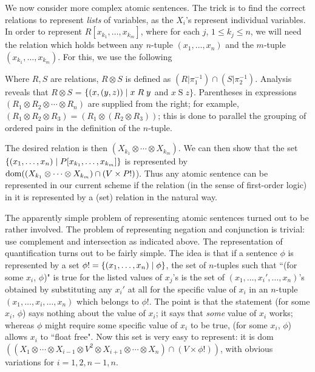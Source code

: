 We now consider more complex atomic sentences.  The trick is
to find the correct relations to represent {\itshape lists\/}
of variables, as the $X_i$'s represent individual variables.  In order to
represent $R[x_{k_1},\ldots,x_{k_m}]$, where for each $j$, $1 \leq k_j \leq n$,
we will need the relation which holds between any $n$-tuple $(x_1,\ldots,x_n)$
and the $m$-tuple $(x_{k_1},\ldots,x_{k_m})$.  For this, we use the following

\begin{definition}
 Where $R, S$ are relations, $R \otimes S$ is defined as $(R|\pi_1^{-1}) \cap
 (S|\pi_2^{-1})$.  Analysis reveals that $R \otimes S$ = $\{(x,(y,z)) \mid x
 \mathrel{R} y$ and $x \mathrel{S} z\}$.  Parentheses in expressions $(R_1
 \otimes R_2 \otimes\cdots \otimes R_n)$ are supplied from the right; for
 example,
 $(R_1 \otimes R_2 \otimes R_3) = (R_1 \otimes (R_2 \otimes R_3))$; this is
 done to parallel the grouping of ordered pairs in the 
 definition of the $n$-tuple.
\end{definition}

The desired relation is then $(X_{k_1} \otimes \cdots \otimes
X_{k_m})$.  We can then show that the set $\{(x_1,\ldots,x_n) \mid
P[x_{k_1},\ldots,x_{k_m}]\}$ is represented by 
$\mathop{\mathrm{dom}}((X_{k_1} \otimes\cdots\otimes X_{k_m}) \cap (V \times P!)$).
Thus any atomic sentence can be represented in our current scheme if the
relation (in the sense of first-order logic)
in it is represented by a (set) relation in the natural way.

The apparently simple problem of representing atomic sentences
turned out to be rather involved.  The problem of representing
negation and conjunction is trivial: use complement and
intersection
as indicated above.  The representation of quantification turns out to
be fairly simple.  The idea is that if a sentence $\phi$ is
represented by a set $\phi! = \{(x_1,\ldots,x_n) \mid \phi\}$, the set
of $n$-tuples such that ``(for some $x_i$, $\phi$)" is true for the
listed values of $x_j$'s is the set of
$(x_1,\ldots,x_i',\ldots,x_n)$'s obtained by substituting any $x_i'$
at all for the specific value of $x_i$ in an $n$-tuple
$(x_1,\ldots,x_i,\ldots,x_n)$ which belongs to $\phi!$.  The point is
that the statement (for some $x_i$, $\phi$) says nothing about the
value of $x_i$; it says that {\itshape some\/} value of $x_i$ works;
whereas $\phi$ might require some specific value of $x_i$ to be true,
(for some $x_i$, $\phi$) allows $x_i$ to ``float free".  Now this set is
very easy to represent: it is dom$((X_1 \otimes \cdots \otimes X_{i-1}
\otimes V^2 \otimes X_{i+1} \otimes \cdots \otimes X_n) \cap (V \times
\phi!))$, with obvious variations for $i=1,2,n-1,n$.

